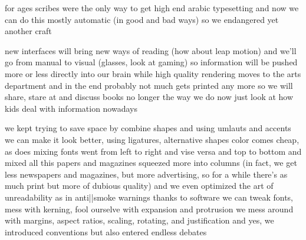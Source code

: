     \startitemize
        \startitem for ages scribes were the only way to get high end arabic typesetting \FlushStep \stopitem
        \startitem and now we can do this mostly automatic (in good and bad ways) \FlushStep \stopitem
        \startitem so we endangered yet another craft  \FlushStep \stopitem
    \stopitemize


\stoptopic

\StopSteps

\StartSteps

\starttopic[title=But eventually]

    \FlushStep

    \startitemize
        \startitem new interfaces will bring new ways of reading (how about leap motion) \FlushStep \stopitem
        \startitem and we'll go from manual to visual (glasses, look at gaming) \FlushStep \stopitem
        \startitem so information will be pushed more or less directly into our brain \FlushStep \stopitem
        \startitem while high quality rendering moves to the arts department \FlushStep \stopitem
        \startitem and in the end probably not much gets printed any more \FlushStep \stopitem
        \startitem so we will share, stare at and discuss books no longer the way we do now \FlushStep \stopitem
        \startitem just look at how kids deal with information nowadays \FlushStep \stopitem
    \stopitemize

\stoptopic

\StopSteps

\StartSteps

\starttopic[title=Targeting paper]

    \FlushStep

    \startitemize
        \startitem we kept trying to save space by combine shapes and using umlauts and accents \FlushStep \stopitem
        \startitem we can make it look better, using ligatures, alternative shapes \FlushStep \stopitem
        \startitem color comes cheap, as does mixing fonts \FlushStep \stopitem
        \startitem went from left to right and vise versa and top to bottom and mixed all this \FlushStep \stopitem
        \startitem papers and magazines squeezed more into columns (in fact, we get less newspapers and magazines, but more advertising, so for a while there's as much print but more of dubious quality) \FlushStep \stopitem
        \startitem and we even optimized the art of unreadability as in anti||smoke warnings \FlushStep \stopitem
        \startitem thanks to software we can tweak fonts, mess with kerning, fool ourselve with expansion and protrusion \FlushStep \stopitem
        \startitem we mess around with margins, aspect ratios, scaling, rotating, and justification \FlushStep \stopitem
        \startitem and yes, we introduced conventions but also entered endless debates \FlushStep \stopitem
    \stopitemize

